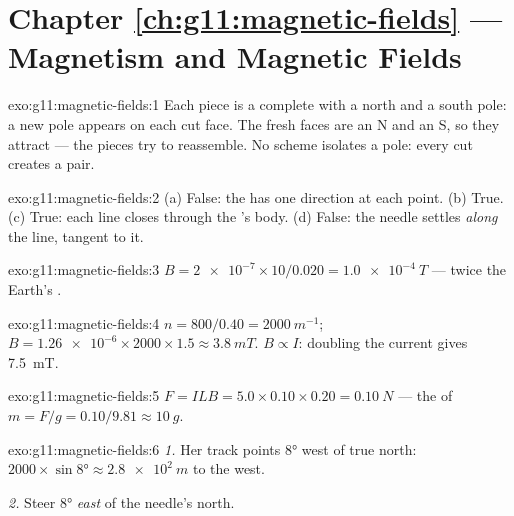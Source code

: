 \section*{Chapter \ref{ch:g11:magnetic-fields} --- Magnetism and Magnetic Fields}

\begin{solution}{exo:g11:magnetic-fields:1}
Each piece is a complete  with a north and a south pole: a new
pole appears on each cut face. The fresh faces are an N and an S, so
they attract --- the pieces try to reassemble. No scheme isolates a
pole: every cut creates a pair.
\end{solution}

\begin{solution}{exo:g11:magnetic-fields:2}
(a) False: the  has one direction at each point. (b) True.
(c) True: each line closes through the 's body. (d) False: the
needle settles \emph{along} the line, tangent to it.
\end{solution}

\begin{solution}{exo:g11:magnetic-fields:3}
$B = \num{2e-7} \times 10 / 0.020 = \qty{1.0e-4}{T}$ --- twice the
Earth's .
\end{solution}

\begin{solution}{exo:g11:magnetic-fields:4}
$n = 800/0.40 = \qty{2000}{m^{-1}}$;
$B = \num{1.26e-6} \times 2000 \times 1.5 \approx \qty{3.8}{mT}$.
$B \propto I$: doubling the current gives \qty{7.5}{mT}.
\end{solution}

\begin{solution}{exo:g11:magnetic-fields:5}
$F = ILB = 5.0 \times 0.10 \times 0.20 = \qty{0.10}{N}$ --- the 
of $m = F/g = 0.10/9.81 \approx \qty{10}{g}$.
\end{solution}

\begin{solution}{exo:g11:magnetic-fields:6}
\emph{1.} Her track points $\ang{8}$ west of true north:
$2000 \times \sin\ang{8} \approx \qty{2.8e2}{m}$ to the west.

\emph{2.} Steer $\ang{8}$ \emph{east} of the needle's north.
\end{solution}

